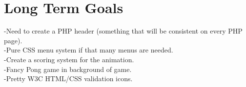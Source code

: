 \section{Long Term Goals}
	-Need to create a PHP header (something that will be consistent on every PHP page).\\
	-Pure CSS menu system if that many menus are needed.\\
	-Create a scoring system for the animation.\\
	-Fancy Pong game in background of game.\\
	-Pretty W3C HTML/CSS validation icons.\\




